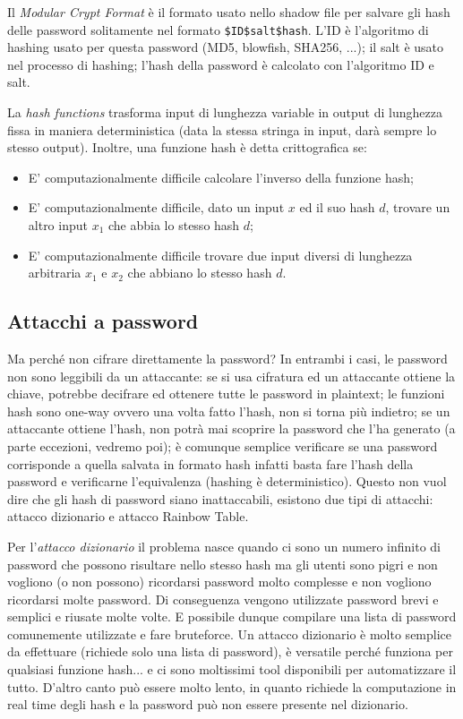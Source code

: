 Il \textit{Modular Crypt Format} è il formato usato nello shadow file per salvare gli hash delle password solitamente nel formato \verb|$ID$salt$hash|. L'ID è l'algoritmo di hashing usato per questa password (MD5, blowfish, SHA256, ...); il salt è usato nel processo di hashing; l'hash della password è calcolato con l'algoritmo ID e salt.

La \textit{hash functions} trasforma input di lunghezza variable in output di lunghezza fissa in maniera deterministica (data la stessa stringa in input, darà sempre lo stesso output). Inoltre, una funzione hash è detta crittografica se:
\begin{itemize}
    \item E' computazionalmente difficile calcolare l'inverso della funzione hash;
    \item E' computazionalmente difficile, dato un input $x$ ed il suo hash $d$, trovare un altro input $x_1$ che abbia lo stesso hash $d$;
    \item E' computazionalmente difficile trovare due input diversi di lunghezza arbitraria $x_1$ e $x_2$ che abbiano lo stesso hash $d$.
\end{itemize}

\subsection*{Attacchi a password}
Ma perché non cifrare direttamente la password? In entrambi i casi, le password non sono leggibili da un attaccante: se si usa cifratura ed un attaccante ottiene la chiave, potrebbe decifrare ed ottenere tutte le password in plaintext; le funzioni hash sono one-way ovvero una volta fatto l'hash, non si torna più indietro; se un attaccante ottiene l'hash, non potrà mai scoprire la password che l'ha generato (a parte eccezioni, vedremo poi); è comunque semplice verificare se una password corrisponde a quella salvata in formato hash infatti basta fare l'hash della password
e verificarne l'equivalenza (hashing è deterministico). Questo non vuol dire che gli hash di password siano inattaccabili, esistono due tipi di attacchi: attacco dizionario e attacco Rainbow Table.

Per l'\textit{attacco dizionario} il problema nasce quando ci sono un numero infinito di password che possono
risultare nello stesso hash ma gli utenti sono pigri e non vogliono (o non possono) ricordarsi password molto complesse e non vogliono ricordarsi molte password. Di conseguenza vengono utilizzate password brevi e semplici e riusate molte volte. E possibile dunque compilare una lista di password comunemente utilizzate e fare bruteforce. Un attacco dizionario è molto semplice da effettuare (richiede solo una lista di password), è versatile perché funziona per qualsiasi funzione hash... e ci sono moltissimi tool disponibili per automatizzare il tutto. D'altro canto può essere molto lento, in quanto richiede la computazione in real time degli hash e la password può non essere presente nel dizionario.

